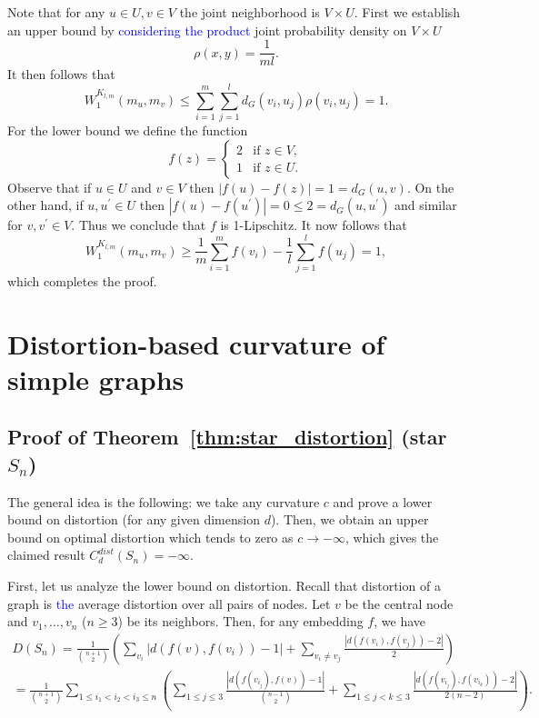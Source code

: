 \documentclass{article} %
\newcommand{\ph}[1]{\textcolor{blue}{#1}}
\begin{document}
Note that for any $u \in U, v \in V$ the joint neighborhood is $V \times U$. First we establish an upper bound by \ph{considering the product} joint probability density on $V \times U$
\[
	\rho(x,y) =	\frac{1}{m l}.
\]
It then follows that
\[
	W_1^{K_{l,m}}(m_{u},m_{v}) \le \sum_{i = 1}^m \sum_{j = 1}^l d_G(v_i, u_j) \rho(v_i, u_j)
	= 1.
\]
For the lower bound we define the function
\[
	f(z) = \begin{cases}
		2 &\mbox{if } z \in V,\\
		1 &\mbox{if } z \in U.
	\end{cases}
\]
Observe that if $u \in U$ and $v \in V$ then $|f(u) - f(z)| = 1 = d_G(u,v)$. On the other hand, if $u, u^\prime \in U$ then $|f(u) - f(u^\prime)| = 0 \le 2 = d_G(u,u^\prime)$ and similar for $v, v^\prime \in V$. Thus we conclude that $f$ is 1-Lipschitz. It now follows that
\[
	W_1^{K_{l,m}}(m_u,m_v) \ge \frac{1}{m} \sum_{i = 1}^m f(v_i) - \frac{1}{l} \sum_{j = 1}^l f(u_j) = 1,
\]
which completes the proof.

\section{Distortion-based curvature of simple graphs}

\subsection{Proof of Theorem~\ref{thm:star_distortion} (star $S_n$)}\label{app:star_distortion}

The general idea is the following: we take any curvature $c$ and prove a lower bound on distortion (for any given dimension $d$). Then, we obtain an upper bound on optimal distortion which tends to zero as $c \to -\infty$, which gives the claimed result $C_d^{dist}(S_n) = -\infty$.

First, let us analyze the lower bound on distortion. Recall that distortion of a graph is \ph{the} average distortion over all pairs of nodes. Let $v$ be the central node and $v_1, \ldots, v_n$ ($n \ge 3$) be its neighbors. Then, for any embedding $f$, we have
\begin{multline*}
D(S_n) = \frac{1}{\binom{n+1}{2}} \left( \sum_{v_i} {|d(f(v),f(v_i)) - 1|} + \sum_{v_i \neq v_j} \frac{|d(f(v_i),f(v_j)) - 2|}{2} \right) \\
= \frac{1}{\binom{n+1}{2}} \sum_{1 \le i_1 < i_2 < i_3 \le n} \left(
\sum_{1\le j \le 3}  \frac{|d(f(v_{i_j}),f(v)) - 1|}{{n-1 \choose 2}} +
\sum_{1\le j < k\le 3}  \frac{|d(f(v_{i_j}),f(v_{i_k})) - 2|}{2(n-2)}   \right).
\end{multline*}
\end{document}
